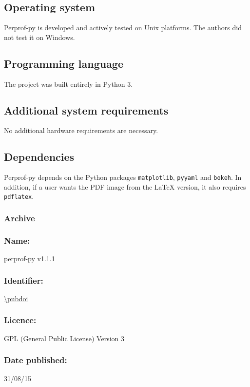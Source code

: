 \subsection*{Operating system}

    Perprof-py is developed and actively tested on Unix platforms.
    The authors did not test it on Windows.

\subsection*{Programming language}

    The project was built entirely in Python 3.

\subsection*{Additional system requirements}

    No additional hardware requirements are necessary.

\subsection*{Dependencies}

    Perprof-py depends on the Python packages \texttt{matplotlib}, \texttt{pyyaml} and \texttt{bokeh}.
    In addition, if a user wants the PDF image from the LaTeX
    version, it also requires \texttt{pdflatex}.

\subsubsection*{Archive}

    \subsubsection*{Name:} perprof-py v1.1.1

    \subsubsection*{Identifier:} \url{\pubdoi}

    \subsubsection*{Licence:} GPL (General Public License) Version 3

    \subsubsection*{Date published:} 31/08/15

